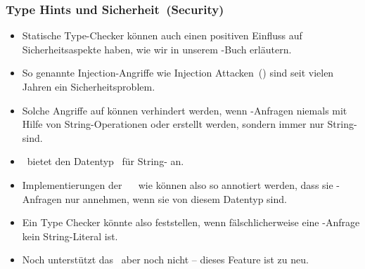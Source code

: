 \documentclass[aspectratio=169,mathserif,notheorems]{beamer}%
\begin{document}
\begin{frame}%
\frametitle{Type Hints und Sicherheit~(Security)}%
\begin{itemize}%
\item Statische Type-Checker können auch einen positiven Einfluss auf Sicherheitsaspekte haben, wie wir in unserem -Buch erläutern.%
%
\item<2-> So genannte Injection-Angriffe wie  Injection Attacken~() sind seit vielen Jahren ein Sicherheitsproblem.%
\item<3-> Solche Angriffe auf  können verhindert werden, wenn \sql-Anfragen niemals mit Hilfe von String-Operationen oder  erstellt werden, sondern immer nur String- sind.%
%
\item<4-> \python\ bietet den Datentyp~ für String- an.%
%
\item<5-> Implementierungen der \python\ \db\  wie \psycopg{} können also so annotiert werden, dass sie \sql-Anfragen nur annehmen, wenn sie von diesem Datentyp sind.%
%
\item<6-> Ein Type Checker könnte also feststellen, wenn fälschlicherweise eine \sql-Anfrage kein String-Literal ist.%
%
\item<7-> Noch unterstützt das \mypy\ aber noch nicht -- dieses Feature ist zu neu.%
%
\end{itemize}%
\end{frame}%
%
%
\end{document}
